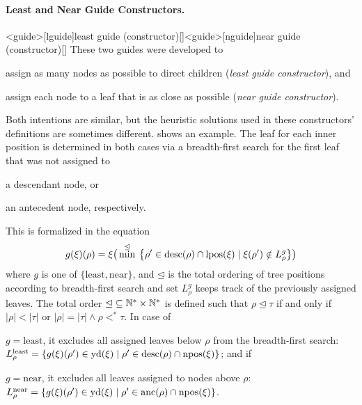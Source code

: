 \documentclass[../../document.tex]{subfiles}
\begin{document}
    \paragraph{Least and Near Guide Constructors.}<guide>[lguide]{least guide (constructor)}[]<guide>[nguide]{near guide (constructor)}[]
    These two guides were developed to
    \begin{inparaenum}
        \item assign as many nodes as possible to direct children (\emph{least guide constructor}), and
        \item assign each node to a leaf that is as close as possible (\emph{near guide constructor}).
    \end{inparaenum}
    Both intentions are similar, but the heuristic solutions used in these constructors' definitions are sometimes different.
     shows an example.
    The leaf for each inner position is determined in both cases via a breadth-first search for the first leaf that was not assigned to
    \begin{inparaenum}
        \item a descendant node, or
        \item an antecedent node, respectively.
    \end{inparaenum}
    This is formalized in the equation
    \[
    g(\xi)(\rho) = \xi\big( \min^{\unlhd} \: \big\{\rho' \in \operatorname{desc}(\rho) \cap \operatorname{lpos}(\xi) \mid \xi(\rho') \notin L^g_\rho \big\} \big)
    \]
    where \(g\) is one of \(\{\mathrm{least}, \mathrm{near}\}\), and \(\unlhd\) is the total ordering of tree positions according to breadth-first search and set \(L^g_\rho\) keeps track of the previously assigned leaves.
    The total order \(\unlhd \subseteq \mathbb{N}^* \times \mathbb{N}^*\) is defined such that \(\rho \unlhd \tau\) if and only if \(|\rho| < |\tau|\) or \(|\rho| = |\tau| \land \rho <^* \tau\).
    In case of
    \begin{inparaenum}
        \item \(g = \mathrm{least}\), it excludes all assigned leaves below \(\rho\) from the breadth-first search:
        \(L^{\text{least}}_\rho = \{ g(\xi)(\rho') \in \operatorname{yd}(\xi) \mid \rho' \in \operatorname{desc}(\rho) \cap \operatorname{npos}(\xi) \}\); and if
        \item \(g = \mathrm{near}\), it excludes all leaves assigned to nodes above \(\rho\):
        \(L^{\text{near}}_\rho = \{ g(\xi)(\rho') \in \operatorname{yd}(\xi) \mid \rho' \in \operatorname{anc}(\rho) \cap \operatorname{npos}(\xi) \}\).
    \end{inparaenum}
\end{document}
